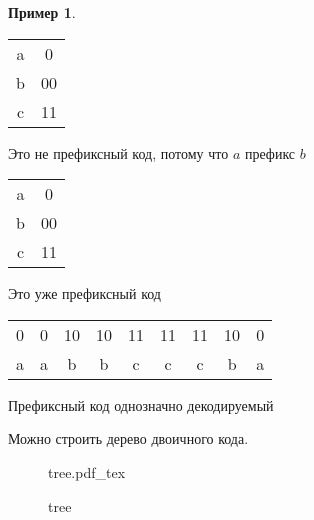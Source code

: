 \documentclass{book}
\theoremstyle{definition}
\newtheorem*{example}{Пример}
\newcommand{\incfig}[1]{%
    \def\svgwidth{\columnwidth}
    {#1.pdf_tex}
}
\begin{document}
\begin{example}
    \begin{tabular}{cc}
        a&0\\
        b&00\\
        c&11\\
    \end{tabular}
Это не префиксный код, потому что $a$ префикс  $b$


    \begin{tabular}{cc}
        a&0\\
        b&00\\
        c&11\\
    \end{tabular}

    Это уже префиксный код

    \begin{tabular}{c|c|c|c|c|c|c|c|c}
        0&0&10&10&11&11&11&10&0\\
        a&a&b&b&c&c&c&b&a\\
    \end{tabular}
\end{example}

\begin{lemma}
    Префиксный код однозначно декодируемый
\end{lemma}

Можно строить дерево двоичного кода.
\begin{figure}[ht]
    \centering
    \incfig{tree}
    \caption{tree}
    \label{fig:tree}
\end{figure}
\end{document}
